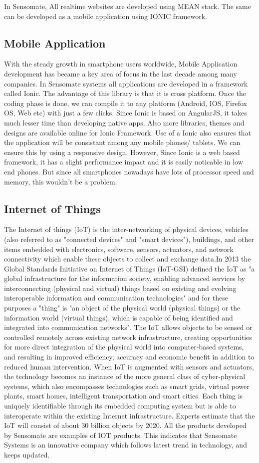 \documentclass[a4paper,12pt]{report}
\begin{document}
			In Sensomate, All realtime websites are developed using MEAN stack. The same can be developed as a mobile application using IONIC framework.
			\subsection{Mobile Application}
			With the steady growth in smartphone users worldwide, Mobile Application development has became a key area of focus in the last decade among many companies. In Sensomate systems all applications are developed in a framework called Ionic. The advantage of this library is that it is cross platform. Once the coding phase is done, we can compile it to any platform (Android, IOS, Firefox OS, Web etc) with just a few clicks. Since Ionic is based on AngularJS, it takes much lesser time than developing native apps. Also more libraries, themes and designs are available online for Ionic Framework. Use of a Ionic also ensures that the application will be consistant among any mobile phones/ tablets. We can ensure this by using a responsive design.
			However, Since Ionic is a web based framework, it has a slight performance impact and it is easily noticable in low end phones. But since all smartphones nowadays have lots of processor speed and memory, this wouldn't be a problem.
			\subsection{Internet of Things}
			The Internet of things (IoT) is the inter-networking of physical devices, vehicles (also referred to as "connected devices" and "smart devices"), buildings, and other items embedded with electronics, software, sensors, actuators, and network connectivity which enable these objects to collect and exchange data.In 2013 the Global Standards Initiative on Internet of Things (IoT-GSI) defined the IoT as "a global infrastructure for the information society, enabling advanced services by interconnecting (physical and virtual) things based on existing and evolving interoperable information and communication technologies" and for these purposes a "thing" is "an object of the physical world (physical things) or the information world (virtual things), which is capable of being identified and integrated into communication networks". The IoT allows objects to be sensed or controlled remotely across existing network infrastructure, creating opportunities for more direct integration of the physical world into computer-based systems, and resulting in improved efficiency, accuracy and economic benefit in addition to reduced human intervention. When IoT is augmented with sensors and actuators, the technology becomes an instance of the more general class of cyber-physical systems, which also encompasses technologies such as smart grids, virtual power plants, smart homes, intelligent transportation and smart cities. Each thing is uniquely identifiable through its embedded computing system but is able to interoperate within the existing Internet infrastructure. Experts estimate that the IoT will consist of about 30 billion objects by 2020.
			All the products developed by Sensomate are examples of IOT products. This indicates that Sensomate Systems is an innovative company which follows latest trend in technology, and keeps updated.
\end{document}
